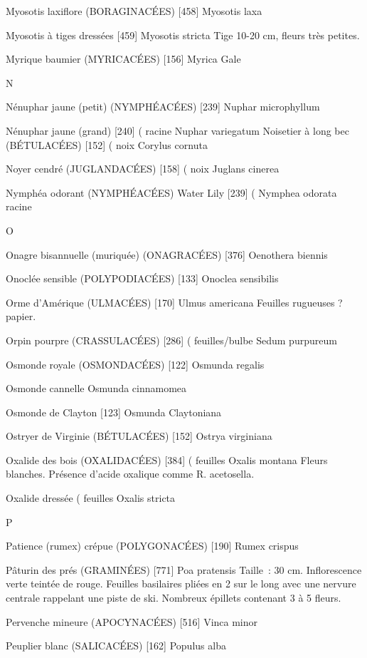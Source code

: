 \documentclass[book,12pt,a4paper,onecolumn,openany]{memoir}
\begin{document}
Myosotis laxiflore (BORAGINACÉES)  [458]
				Myosotis laxa

Myosotis à tiges dressées  [459]
				Myosotis stricta
Tige 10-20 cm, fleurs très petites.

Myrique baumier (MYRICACÉES)  [156]
				Myrica Gale

N

Nénuphar jaune (petit) (NYMPHÉACÉES)  [239]
				Nuphar microphyllum

Nénuphar jaune (grand)  [240]				( racine
				Nuphar variegatum
Noisetier à long bec (BÉTULACÉES)  [152]		( noix
				Corylus cornuta

Noyer cendré (JUGLANDACÉES)  [158]			( noix
				Juglans cinerea

Nymphéa odorant (NYMPHÉACÉES) Water Lily [239]		(
				Nymphea odorata				racine

O

Onagre bisannuelle (muriquée) (ONAGRACÉES)  [376]
				Oenothera biennis

Onoclée sensible (POLYPODIACÉES)  [133]
				Onoclea sensibilis

Orme d’Amérique (ULMACÉES)  [170]
				Ulmus americana
Feuilles rugueuses ? papier.

Orpin pourpre (CRASSULACÉES)  [286]		( feuilles/bulbe
				Sedum purpureum

Osmonde royale (OSMONDACÉES) [122]
				Osmunda regalis

Osmonde cannelle
				Osmunda cinnamomea

Osmonde de Clayton  [123]
				Osmunda Claytoniana

Ostryer de Virginie (BÉTULACÉES) [152]
				Ostrya virginiana

Oxalide des bois (OXALIDACÉES)  [384]		( feuilles
				Oxalis montana
Fleurs blanches. Présence d’acide oxalique comme R. acetosella.

Oxalide dressée							( feuilles
				Oxalis stricta

P

Patience (rumex) crépue (POLYGONACÉES)  [190]
				Rumex crispus

Pâturin des prés (GRAMINÉES)  [771]
				Poa pratensis
Taille : 30 cm. Inflorescence verte teintée de rouge.
Feuilles basilaires pliées en 2 sur le long avec une nervure centrale rappelant une piste de ski.
Nombreux épillets contenant 3 à 5 fleurs.

Pervenche mineure (APOCYNACÉES)  [516]
				Vinca minor

Peuplier blanc (SALICACÉES)  [162]
				Populus alba
\end{document}
